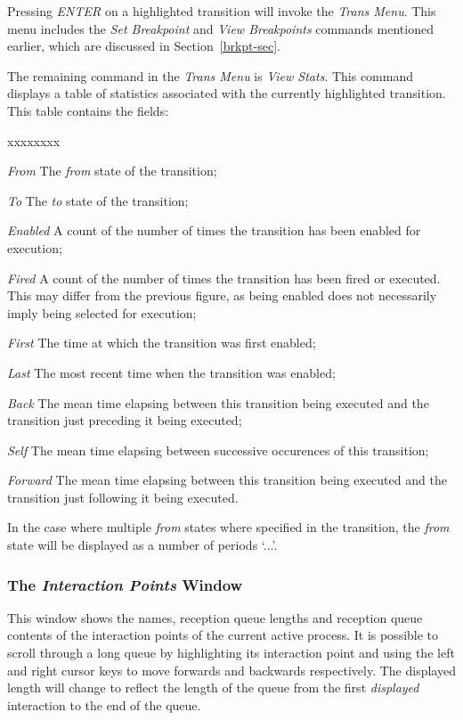 Pressing {\em ENTER} on a highlighted transition will invoke the {\em
Trans Menu}. This menu includes the {\em Set Breakpoint} and {\em
View Breakpoints} commands mentioned earlier, which are discussed
in Section~\ref{brkpt-sec}.

The remaining command in the {\em Trans Menu} is {\em View Stats}.
This command displays a table of statistics associated with the
currently highlighted transition. This table contains the fields:
\begin{describe}{xxxxxxxx}
\item[\em From]The {\em from} state of the transition;
\item[\em To]The {\em to} state of the transition;
\item[\em Enabled]A count of the number of times the transition has been enabled
for execution;
\item[\em Fired]A count  of the number of times the transition has been fired
or executed. This may differ from the previous figure, as being
enabled does not necessarily imply being selected for execution;
\item[\em First]The time at which the transition was first enabled;
\item[\em Last]The most recent time when the transition was enabled;
\item[\em Back]The mean time elapsing between this transition being
executed and the transition just preceding it being executed;
\item[\em Self]The mean time elapsing between successive occurences
of this transition;
\item[\em Forward]The mean time elapsing between this transition
being executed and the transition just following it being executed.
\end{describe}
In the case where multiple {\em from} states where specified in the
transition, the {\em from} state will be displayed as a number of
periods `...'.

\subsubsection[The {\em Interaction Points} Window]{The {\em Interaction
Points} Window}

This window shows the names, reception queue lengths and reception
queue contents of the interaction points of the current active
process. It is possible to scroll through a long queue by
highlighting its interaction point and using the left and right
cursor keys to move forwards and backwards respectively.
The displayed length will change to reflect the length
of the queue from the first {\em displayed} interaction to the end of
the queue.

